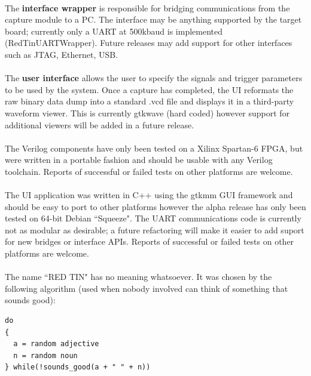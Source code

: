 \documentclass[pdftex]{article}
\begin{document}
\paragraph*{}
The {\bf interface wrapper} is responsible for bridging communications from the capture module to a PC. The interface
may be anything supported by the target board; currently only a UART at 500kbaud is implemented (RedTinUARTWrapper).
Future releases may add support for other interfaces such as JTAG, Ethernet, USB.

\paragraph*{}
The {\bf user interface} allows the user to specify the signals and trigger parameters to be used by the system. Once
a capture has completed, the UI reformats the raw binary data dump into a standard .vcd file and displays it in a
third-party waveform viewer. This is currently gtkwave (hard coded) however support for additional viewers will be
added in a future release.

\paragraph*{}
The Verilog components have only been tested on a Xilinx Spartan-6 FPGA, but were written in a portable fashion and
should be usable with any Verilog toolchain. Reports of successful or failed tests on other platforms are welcome.

\paragraph*{}
The UI application was written in C++ using the gtkmm GUI framework and should be easy to port to other platforms
however the alpha release has only been tested on 64-bit Debian ``Squeeze". The UART communications code is currently
not as modular as desirable; a future refactoring will make it easier to add suport for new bridges or interface APIs.
Reports of successful or failed tests on other platforms are welcome.

\paragraph*{}
The name ``RED TIN" has no meaning whatsoever. It was chosen by the following algorithm (used when nobody involved can
think of something that sounds good):
\begin{verbatim}
do
{
  a = random adjective
  n = random noun
} while(!sounds_good(a + " " + n))
\end{verbatim}
\end{document}

